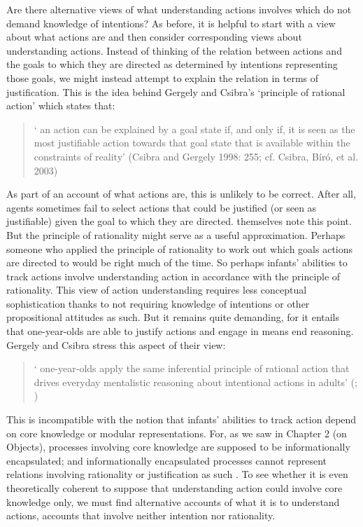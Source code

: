 \documentclass[12pt,\papersize]{extarticle}
\begin{document}
Are there alternative views of what understanding actions involves which do not demand knowledge of intentions?
As before, it is helpful to start with a view about what actions are and then consider corresponding views about understanding actions.
Instead of thinking of the relation between actions and the goals to which they are directed as determined by intentions representing those goals,
we might instead attempt to explain the relation in terms of justification.
This is the idea behind Gergely and Csibra's `principle of rational action' which states that:
%
\begin{quote}
`%
an action can be explained by a goal state if, and only if, it is seen as the most justifiable action towards that goal state that is available within the constraints of reality' 
(Csibra and Gergely 1998: 255; cf. Csibra, Bíró, et al. 2003)
\end{quote}
%
As part of an account of what actions are, this is unlikely to be correct.
After all, agents sometimes fail to select actions that could be justified (or seen as justifiable) given the goal to which they are directed.
\citet[p.\ 123]{Csibra:2003jv} themselves note this point.
But the principle of rationality might serve as a useful approximation.
Perhaps someone who applied the principle of rationality to work out which goals actions are directed to would be right much of the time. 
So perhaps infants' abilities to track actions involve understanding action in accordance with the principle of rationality.
This view of action understanding requires less conceptual sophistication thanks to not requiring knowledge of intentions or other propositional attitudes as such. 
But it remains quite demanding, for it entails that one-year-olds  are able to justify actions and engage in means end reasoning.
Gergely and Csibra stress this aspect of their view:
%
\begin{quote}
`%
one-year-olds apply the same inferential principle of rational action that drives everyday mentalistic reasoning about intentional actions in adults' (\citealp[p.\ 259]{Csibra:1998cx}; \citealp[compare][p.\ 290]{Gergely:2003gb})
\end{quote}
%
This is incompatible with the notion that infants' abilities to track action depend on core knowledge or modular representations.
For, as we saw in Chapter 2 (on Objects),  processes involving core knowledge  are supposed to be informationally encapsulated;
and informationally encapsulated processes cannot represent relations involving rationality or justification as such \citep{Fodor:2000cj}.
To see whether it is even theoretically coherent to suppose that understanding action could involve core knowledge only, we must find alternative accounts of what it is to understand actions, accounts that involve neither intention nor rationality.
\end{document}
